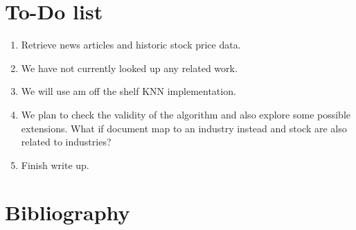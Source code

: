 \documentclass[11pt,letterpaper]{article}
\newcommand{\blue}[1]{\textcolor{RoyalBlue}{#1}}
\newcommand{\instructions}[1]{\blue{\textit{#1}}}
\renewcommand{\instructions}[1]{}
\begin{document}
\section*{To-Do list}
\instructions{Get started by making a to-do list. If you have a group
  project: who will do what? Set yourself deadlines. Here are a few
  items that might appear on your to-do list}
\begin{enumerate}
\item Retrieve news articles and historic stock price data.
\item We have not currently looked up any related work.
\item We will use am off the shelf KNN implementation.
\item We plan to check the validity of the algorithm and also explore some possible
  extensions. What if document map to an industry instead and stock are also related
  to industries?
\item Finish write up.
\end{enumerate}

\section*{Bibliography}
{}

\end{document}
